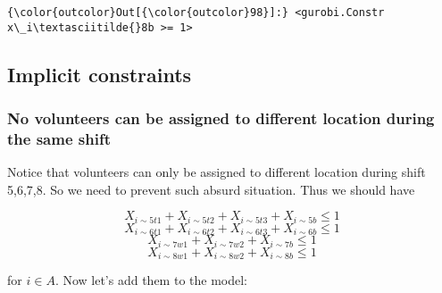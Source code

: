 \documentclass[11pt]{article}
\begin{document}
            \begin{Verbatim}[commandchars=\\\{\}]
{\color{outcolor}Out[{\color{outcolor}98}]:} <gurobi.Constr x\_i\textasciitilde{}8b >= 1>
\end{Verbatim}
        
    \subsection{Implicit constraints}\label{implicit-constraints}

\subsubsection{No volunteers can be assigned to different location
during the same
shift}\label{no-volunteers-can-be-assigned-to-different-location-during-the-same-shift}

Notice that volunteers can only be assigned to different location during
shift 5,6,7,8. So we need to prevent such absurd situation. Thus we
should have

\[ X_{i \sim 5t1} + X_{i \sim 5t2} + X_{i \sim 5t3} + X_{i \sim 5b} \leq 1 \]
\[ X_{i \sim 6t1} + X_{i \sim 6t2} + X_{i \sim 6t3} + X_{i \sim 6b} \leq 1\]
\[ X_{i \sim 7w1} + X_{i \sim 7w2} + X_{i \sim 7b} \leq 1 \]
\[ X_{i \sim 8w1} + X_{i \sim 8w2} + X_{i \sim 8b} \leq 1 \]

for \(i\in A\). Now let's add them to the model:
\end{document}
